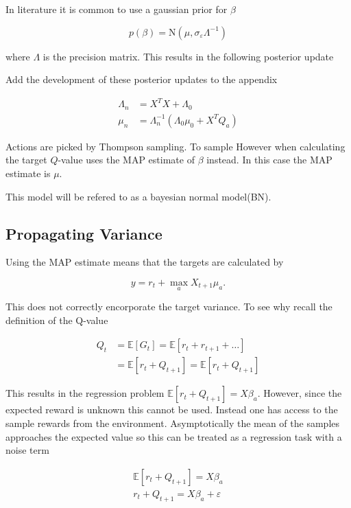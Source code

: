 In literature it is common to use a gaussian prior for $\beta$

$$
p(\beta) = \text{N}(\mu, \sigma_\varepsilon\Lambda^{-1}) 
$$

where $\Lambda$ is the precision matrix. This results in the following posterior update

\todo Add the development of these posterior updates to the appendix

\begin{equation}
    \begin{split}
        \label{eq:known_noise_posterior_update}
        \Lambda_n & = X^TX + \Lambda_0 \\
        \mu_n     & = \Lambda_n^{-1}(\Lambda_0\mu_0 + X^TQ_a)
    \end{split}
\end{equation}

Actions are picked by Thompson sampling. To sample However when calculating the target $Q$-value \cite{azziz_2018} uses the MAP estimate of $\beta$ instead. In this case the MAP estimate is $\mu$.

This model will be refered to as a bayesian normal model(BN).

\subsection{Propagating Variance}

Using the MAP estimate means that the targets are calculated by 

$$
y = r_t + \max_a X_{t+1}\mu_a.
$$

This does not correctly encorporate the target variance. To see why recall the definition of the Q-value

\begin{align*}
    Q_t &= \mathbb{E}[G_t] = \mathbb{E}[r_t + r_{t+1} + \dots] \\
    &= \mathbb{E}[r_t + Q_{t+1}] = \mathbb{E}[r_t + Q_{t+1}]
\end{align*}

This results in the regression problem $\mathbb{E}[r_t + Q_{t+1}] = X\beta_a$. However, since the expected reward is unknown this cannot be used. Instead one has access to the sample rewards from the environment. Asymptotically the mean of the samples approaches the expected value so this can be treated as a regression task with a noise term

\begin{align*}
    \mathbb{E}[r_t + Q_{t+1}] = X\beta_a \\
    r_t + Q_{t+1} = X\beta_a + \varepsilon
\end{align*}

